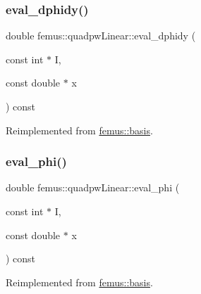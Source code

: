 \mbox{\label{classfemus_1_1quadpw_linear_aef9781d267a0a0a6af0b47e71bba9ec3}} 
\subsubsection{\texorpdfstring{eval\+\_\+dphidy()}{eval\_dphidy()}}
{\footnotesize\ttfamily double femus\+::quadpw\+Linear\+::eval\+\_\+dphidy (\begin{DoxyParamCaption}\item[{const int $\ast$}]{I,  }\item[{const double $\ast$}]{x }\end{DoxyParamCaption}) const\hspace{0.3cm}{\ttfamily [virtual]}}



Reimplemented from \mbox{\hyperlink{classfemus_1_1basis_a2819fac9aae797156b9efec8a0b85cc1}{femus\+::basis}}.

\mbox{\label{classfemus_1_1quadpw_linear_a6baa7f92c07d7f745c0f8020e267c8d6}} 
\subsubsection{\texorpdfstring{eval\+\_\+phi()}{eval\_phi()}}
{\footnotesize\ttfamily double femus\+::quadpw\+Linear\+::eval\+\_\+phi (\begin{DoxyParamCaption}\item[{const int $\ast$}]{I,  }\item[{const double $\ast$}]{x }\end{DoxyParamCaption}) const\hspace{0.3cm}{\ttfamily [virtual]}}



Reimplemented from \mbox{\hyperlink{classfemus_1_1basis_a89b0797cdccffae5ff6d059b32016ae5}{femus\+::basis}}.

\mbox{\label{classfemus_1_1quadpw_linear_adb6d97e1f50de6b3567a754897517aa9}} 
